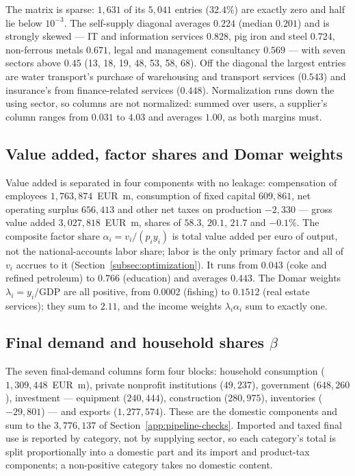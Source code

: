 The matrix is sparse: $1{,}631$ of its
$5{,}041$ entries ($32.4\%$) are exactly zero and half lie below $10^{-3}$.
The self-supply diagonal averages $0.224$ (median $0.201$) and is strongly
skewed --- IT and information services $0.828$, pig iron and steel $0.724$,
non-ferrous metals $0.671$, legal and management consultancy $0.569$ --- with
seven sectors above $0.45$ (13, 18, 19, 48, 53, 58, 68). Off the diagonal the largest
entries are water transport's purchase of warehousing and transport services
($0.543$) and insurance's from finance-related services ($0.448$). Normalization
runs down the using sector, so
columns are not normalized: summed over users, a supplier's column ranges from
$0.031$ to $4.03$ and averages $1.00$, as both margins must.

\subsection{Value added, factor shares and Domar weights}\label{app:pipeline-va}

{\setlength{\emergencystretch}{2em}%
Value added is separated in four components with no leakage: compensation of employees
$1{,}763{,}874$~EUR~m, consumption of fixed capital $609{,}861$, net operating
surplus $656{,}413$ and other net taxes on production $-2{,}330$ --- gross
value added $3{,}027{,}818$~EUR~m, shares of $58.3$, $20.1$, $21.7$ and $-0.1\%$. The composite factor share $\alpha_i=v_i/(p_iy_i)$ is total value added per euro of output, not the national-accounts labor share; labor is the only primary factor and all of $v_i$ accrues to it (Section~\ref{subsec:optimization}). It runs
from $0.043$ (coke and refined petroleum) to $0.766$ (education) and averages
$0.443$. The Domar weights $\lambda_i=y_i/\text{GDP}$ are all positive, from
$0.0002$ (fishing) to $0.1512$ (real estate services); they sum to $2.11$, and
the income weights $\lambda_i\alpha_i$ sum to exactly one.\par}

\subsection{Final demand and household shares $\beta$}\label{app:pipeline-fd}

The seven final-demand columns form four blocks: household consumption
($1{,}309{,}448$~EUR~m), private nonprofit institutions ($49{,}237$),
government ($648{,}260$), investment --- equipment ($240{,}444$), construction
($280{,}975$), inventories ($-29{,}801$) --- and exports ($1{,}277{,}574$). These
are the domestic components and sum to the $3{,}776{,}137$ of
Section~\ref{app:pipeline-checks}. Imported and taxed final use is reported by
category, not by supplying sector, so each category's total is split
proportionally into a domestic part and its import and product-tax components;
a non-positive category takes no domestic content.

